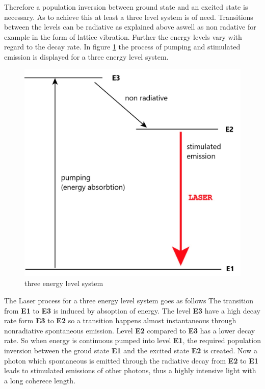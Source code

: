 Therefore a population inversion
between ground state and an excited
state is necessary. As to achieve this at least
a three level system is of need.
Transitions between the levels can be radiative as explained above
aswell as non radative for example in the form of lattice vibration.
Further the energy levels vary with regard
to the decay rate. In figure \ref{fig:3_n} the process of pumping and stimulated emission
is displayed for a three energy level system.
\begin{figure}
  \centering
  \includegraphics{Laser_3_Niveau.jpg}
  \caption{three energy level system}
  \label{fig:3_n}
\end{figure}
The Laser process for a three energy level system
goes as follows
The transition from \textbf{E1} to \textbf{E3} is induced
by absoption of energy.
The level \textbf{E3} have a high
decay rate form \textbf{E3} to \textbf{E2}
so a transition happens almost instantaneous
through nonradiative spontaneous emission.
Level \textbf{E2} compared to \textbf{E3}
has a lower decay rate.
So when energy is continuous
pumped into level \textbf{E1},
the required population inversion
between the groud state \textbf{E1} and the
excited state \textbf{E2} is created.
Now a photon which spontaneous is emitted
through the radiative decay from
\textbf{E2} to \textbf{E1}
leads to
stimulated emissions of other photons,
thus a highly intensive
light with a long coherece length.

